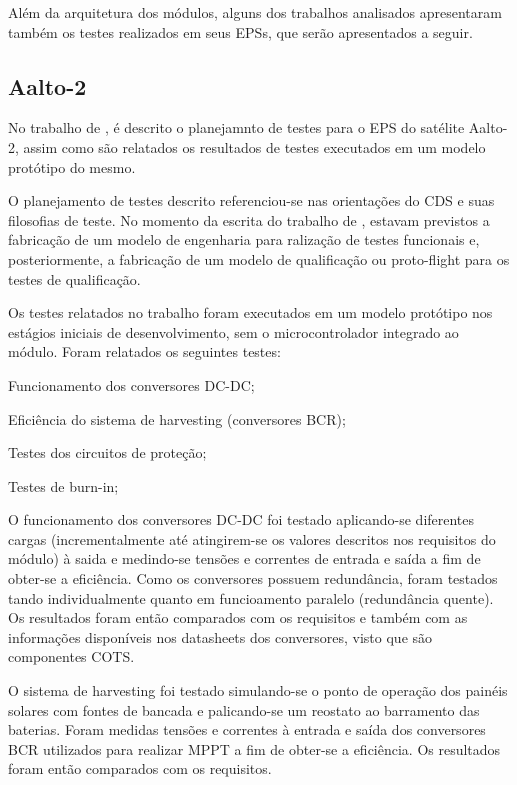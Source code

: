 Além da arquitetura dos módulos, alguns dos trabalhos analisados apresentaram também os testes realizados em seus \gls{EPS}s, que serão apresentados a seguir.

\subsection{Aalto-2}

No trabalho de \textcite{aalto-eps}, é descrito o planejamnto de testes para o EPS do satélite Aalto-2, assim como são relatados os resultados de testes executados em um modelo protótipo do mesmo.

O planejamento de testes descrito referenciou-se nas orientações do \gls{CDS} e suas filosofias de teste.
No momento da escrita do trabalho de \textcite{aalto-eps}, estavam previstos a fabricação de um modelo de engenharia para ralização de testes funcionais e, posteriormente, a fabricação de um modelo de qualificação ou proto-flight para os testes de qualificação.

Os testes relatados no trabalho foram executados em um modelo protótipo nos estágios iniciais de desenvolvimento, sem o microcontrolador integrado ao módulo. Foram relatados os seguintes testes:

\begin{alineas}
    \item Funcionamento dos conversores DC-DC;
    \item Eficiência do sistema de harvesting (conversores \gls{BCR});
    \item Testes dos circuitos de proteção;
    \item Testes de burn-in;
\end{alineas} 

O funcionamento dos conversores DC-DC foi testado aplicando-se diferentes cargas (incrementalmente até atingirem-se os valores descritos nos requisitos do módulo) à saida e medindo-se tensões e correntes de entrada e saída a fim de obter-se a eficiência. Como os conversores possuem redundância, foram testados tando individualmente quanto em funcioamento paralelo (redundância quente).
Os resultados foram então comparados com os requisitos e também com as informações disponíveis nos datasheets dos conversores, visto que são componentes \gls{COTS}.

O sistema de harvesting foi testado simulando-se o ponto de operação dos painéis solares com fontes de bancada e palicando-se um reostato ao barramento das baterias. Foram medidas tensões e correntes à entrada e saída dos conversores \gls{BCR} utilizados para realizar \gls{MPPT} a fim de obter-se a eficiência.
Os resultados foram então comparados com os requisitos.

